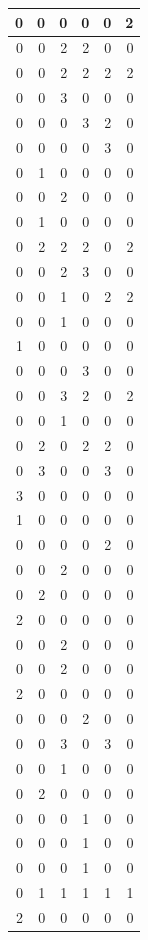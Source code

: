 \documentclass[
  12pt,
]{krantz}
\begin{document}
\begin{tabular}{r|r|r|r|r|r}
\hline
0 & 0 & 0 & 0 & 0 & 2\\
\hline
0 & 0 & 2 & 2 & 0 & 0\\
\hline
0 & 0 & 2 & 2 & 2 & 2\\
\hline
0 & 0 & 3 & 0 & 0 & 0\\
\hline
0 & 0 & 0 & 3 & 2 & 0\\
\hline
0 & 0 & 0 & 0 & 3 & 0\\
\hline
0 & 1 & 0 & 0 & 0 & 0\\
\hline
0 & 0 & 2 & 0 & 0 & 0\\
\hline
0 & 1 & 0 & 0 & 0 & 0\\
\hline
0 & 2 & 2 & 2 & 0 & 2\\
\hline
0 & 0 & 2 & 3 & 0 & 0\\
\hline
0 & 0 & 1 & 0 & 2 & 2\\
\hline
0 & 0 & 1 & 0 & 0 & 0\\
\hline
1 & 0 & 0 & 0 & 0 & 0\\
\hline
0 & 0 & 0 & 3 & 0 & 0\\
\hline
0 & 0 & 3 & 2 & 0 & 2\\
\hline
0 & 0 & 1 & 0 & 0 & 0\\
\hline
0 & 2 & 0 & 2 & 2 & 0\\
\hline
0 & 3 & 0 & 0 & 3 & 0\\
\hline
3 & 0 & 0 & 0 & 0 & 0\\
\hline
1 & 0 & 0 & 0 & 0 & 0\\
\hline
0 & 0 & 0 & 0 & 2 & 0\\
\hline
0 & 0 & 2 & 0 & 0 & 0\\
\hline
0 & 2 & 0 & 0 & 0 & 0\\
\hline
2 & 0 & 0 & 0 & 0 & 0\\
\hline
0 & 0 & 2 & 0 & 0 & 0\\
\hline
0 & 0 & 2 & 0 & 0 & 0\\
\hline
2 & 0 & 0 & 0 & 0 & 0\\
\hline
0 & 0 & 0 & 2 & 0 & 0\\
\hline
0 & 0 & 3 & 0 & 3 & 0\\
\hline
0 & 0 & 1 & 0 & 0 & 0\\
\hline
0 & 2 & 0 & 0 & 0 & 0\\
\hline
0 & 0 & 0 & 1 & 0 & 0\\
\hline
0 & 0 & 0 & 1 & 0 & 0\\
\hline
0 & 0 & 0 & 1 & 0 & 0\\
\hline
0 & 1 & 1 & 1 & 1 & 1\\
\hline
2 & 0 & 0 & 0 & 0 & 0\\

\end{tabular}
\end{document}
